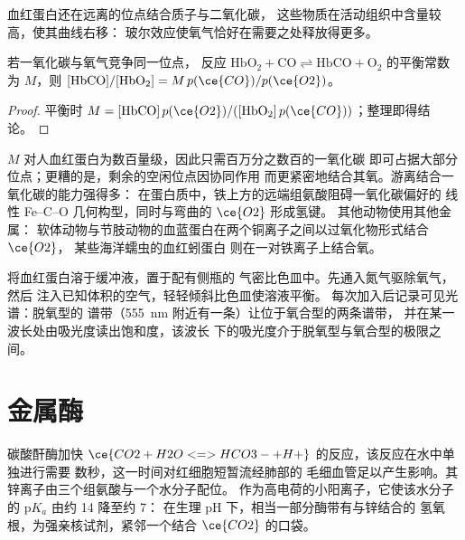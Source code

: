 血红蛋白还在远离的位点结合质子与二氧化碳，
这些物质在活动组织中含量较高，使其曲线右移：
玻尔效应使氧气恰好在需要之处释放得更多。

\begin{proposition}[一氧化碳竞争]\label{prop:b3:bioinorganic:haldane}
若一氧化碳与氧气竞争同一位点，
反应 $\mathrm{HbO_2 + CO \rightleftharpoons HbCO + O_2}$ 的平衡常数为 $M$，则
$[\mathrm{HbCO}]/[\mathrm{HbO_2}] = M\,p(\ce{CO})/p(\ce{O2})$。
\end{proposition}

\begin{proof}
平衡时 $M = [\mathrm{HbCO}]\,p(\ce{O2})/([\mathrm{HbO_2}]\,p(\ce{CO}))$；整理即得结论。
\end{proof}

$M$ 对人血红蛋白为数百量级，因此只需百万分之数百的一氧化碳
即可占据大部分位点；更糟的是，剩余的空闲位点因协同作用
而更紧密地结合其氧。游离结合一氧化碳的能力强得多：
在蛋白质中，铁上方的远端组氨酸阻碍一氧化碳偏好的
线性 Fe--C--O 几何构型，同时与弯曲的 $\ce{O2}$ 形成氢键。
其他动物使用其他金属：
软体动物与节肢动物的血蓝蛋白在两个铜离子之间以过氧化物形式结合 $\ce{O2}$，
某些海洋蠕虫的血红蚓蛋白
则在一对铁离子上结合氧。

\begin{inthelab}[氧结合曲线]
将血红蛋白溶于缓冲液，置于配有侧瓶的
气密比色皿中。先通入氮气驱除氧气，然后
注入已知体积的空气，轻轻倾斜比色皿使溶液平衡。
每次加入后记录可见光谱：脱氧型的
谱带（\qty{555}{nm} 附近有一条）让位于氧合型的两条谱带，
并在某一波长处由吸光度读出饱和度，该波长
下的吸光度介于脱氧型与氧合型的极限之间。
\end{inthelab}

\section{金属酶}

碳酸酐酶加快 $\ce{CO2 + H2O <=> HCO3- + H+}$ 的反应，该反应在水中单独进行需要
数秒，这一时间对红细胞短暂流经肺部的
毛细血管足以产生影响。其锌离子由三个组氨酸与一个水分子配位。
作为高电荷的小阳离子，它使该水分子的 $\mathrm pK_a$ 由约 14 降至约 7：
在生理 pH 下，相当一部分酶带有与锌结合的
氢氧根，为强亲核试剂，紧邻一个结合 $\ce{CO2}$ 的口袋。

